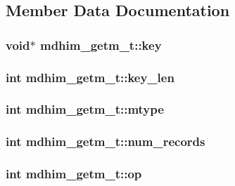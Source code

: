 \subsection{Member Data Documentation}
\hypertarget{structmdhim__getm__t_a53c3aff6037a3e693e09ff4e98bd7eba}{
\subsubsection[{key}]{\setlength{\rightskip}{0pt plus 5cm}void$\ast$ mdhim\-\_\-getm\-\_\-t\-::key}}\label{structmdhim__getm__t_a53c3aff6037a3e693e09ff4e98bd7eba}
\hypertarget{structmdhim__getm__t_a8942a21db02e749c3f3b04b32fea795e}{
\subsubsection[{key\-\_\-len}]{\setlength{\rightskip}{0pt plus 5cm}int mdhim\-\_\-getm\-\_\-t\-::key\-\_\-len}}\label{structmdhim__getm__t_a8942a21db02e749c3f3b04b32fea795e}
\hypertarget{structmdhim__getm__t_a803aef9942bd6bd39d10c22f4f1205d3}{
\subsubsection[{mtype}]{\setlength{\rightskip}{0pt plus 5cm}int mdhim\-\_\-getm\-\_\-t\-::mtype}}\label{structmdhim__getm__t_a803aef9942bd6bd39d10c22f4f1205d3}
\hypertarget{structmdhim__getm__t_ad585955cf1b7a3ffce40fc44062583e9}{
\subsubsection[{num\-\_\-records}]{\setlength{\rightskip}{0pt plus 5cm}int mdhim\-\_\-getm\-\_\-t\-::num\-\_\-records}}\label{structmdhim__getm__t_ad585955cf1b7a3ffce40fc44062583e9}
\hypertarget{structmdhim__getm__t_a81dd92f402e433928b8b3bae7ccdefd8}{
\subsubsection[{op}]{\setlength{\rightskip}{0pt plus 5cm}int mdhim\-\_\-getm\-\_\-t\-::op}}\label{structmdhim__getm__t_a81dd92f402e433928b8b3bae7ccdefd8}
